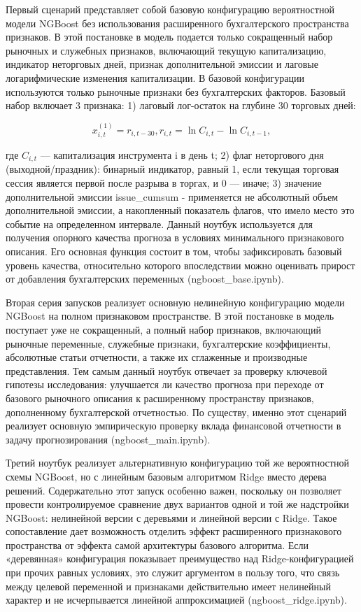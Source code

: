 \documentclass[
]{article}
\begin{document}
Первый сценарий представляет собой базовую конфигурацию вероятностной модели NGBoost без использования расширенного бухгалтерского пространства признаков. В этой постановке в модель подается только сокращенный набор рыночных и служебных признаков, включающий текущую капитализацию, индикатор неторговых дней, признак дополнительной эмиссии и лаговые логарифмические изменения капитализации. В базовой конфигурации используются только рыночные признаки без бухгалтерских факторов. Базовый набор включает 3 признака: 1) лаговый лог-остаток на глубине 30 торговых дней:

\[x_{i,t}^{(1)} = r_{i,t - 30},r_{i,t} = \ln C_{i,t} - \ln C_{i,t - 1},\]

где \(C_{i,t}\) --- капитализация инструмента i в день t; 2) флаг неторгового дня (выходной/праздник): бинарный индикатор, равный 1, если текущая торговая сессия является первой после разрыва в торгах, и 0 --- иначе; 3) значение дополнительной эмиссии issue\_cumsum - применяется не абсолютный объем дополнительной эмиссии, а накопленный показатель флагов, что имело место это событие на определенном интервале. Данный ноутбук используется для получения опорного качества прогноза в условиях минимального признакового описания. Его основная функция состоит в том, чтобы зафиксировать базовый уровень качества, относительно которого впоследствии можно оценивать прирост от добавления бухгалтерских переменных (ngboost\_base.ipynb).

Вторая серия запусков реализует основную нелинейную конфигурацию модели NGBoost на полном признаковом пространстве. В этой постановке в модель поступает уже не сокращенный, а полный набор признаков, включающий рыночные переменные, служебные признаки, бухгалтерские коэффициенты, абсолютные статьи отчетности, а также их сглаженные и производные представления. Тем самым данный ноутбук отвечает за проверку ключевой гипотезы исследования: улучшается ли качество прогноза при переходе от базового рыночного описания к расширенному пространству признаков, дополненному бухгалтерской отчетностью. По существу, именно этот сценарий реализует основную эмпирическую проверку вклада финансовой отчетности в задачу прогнозирования (ngboost\_main.ipynb).

Третий ноутбук реализует альтернативную конфигурацию той же вероятностной схемы NGBoost, но с линейным базовым алгоритмом Ridge вместо дерева решений. Содержательно этот запуск особенно важен, поскольку он позволяет провести контролируемое сравнение двух вариантов одной и той же надстройки NGBoost: нелинейной версии с деревьями и линейной версии с Ridge. Такое сопоставление дает возможность отделить эффект расширенного признакового пространства от эффекта самой архитектуры базового алгоритма. Если «деревянная» конфигурация показывает преимущество над Ridge-конфигурацией при прочих равных условиях, это служит аргументом в пользу того, что связь между целевой переменной и признаками действительно имеет нелинейный характер и не исчерпывается линейной аппроксимацией (ngboost\_ridge.ipynb).
\end{document}
